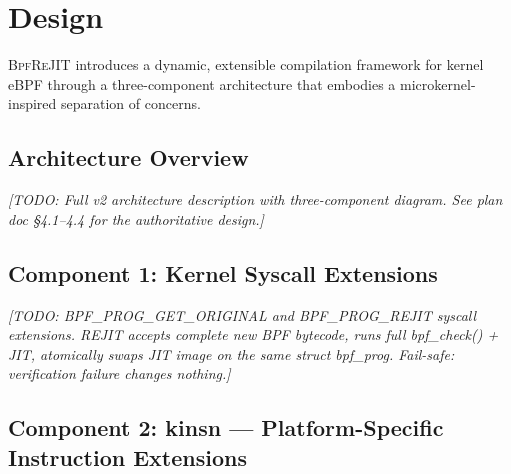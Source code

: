 \documentclass[sigconf,anonymous]{acmart}
\begin{document}
\section{Design}
\label{sec:design}


\textsc{BpfReJIT} introduces a dynamic, extensible compilation
framework for kernel eBPF through a three-component architecture that
embodies a microkernel-inspired separation of concerns.

\subsection{Architecture Overview}
\label{sec:architecture}

\textit{[TODO: Full v2 architecture description with three-component
diagram. See plan doc \S4.1--4.4 for the authoritative design.]}

\subsection{Component 1: Kernel Syscall Extensions}
\label{sec:syscall}

\textit{[TODO: BPF\_PROG\_GET\_ORIGINAL and BPF\_PROG\_REJIT syscall
extensions. REJIT accepts complete new BPF bytecode, runs full
bpf\_check() + JIT, atomically swaps JIT image on the same struct
bpf\_prog. Fail-safe: verification failure changes nothing.]}

\subsection{Component 2: kinsn --- Platform-Specific Instruction Extensions}
\label{sec:kinsn}
\end{document}
